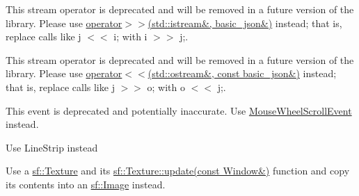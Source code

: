 
\begin{DoxyRefList}
\item[\label{deprecated__deprecated000002}%
\Hypertarget{deprecated__deprecated000002}%
Member \hyperlink{classnlohmann_1_1basic__json_ab7285a92514fcdbe6de505ebaba92ea3}{nlohmann\+:\+:basic\+\_\+json$<$ Object\+Type, Array\+Type, String\+Type, Boolean\+Type, Number\+Integer\+Type, Number\+Unsigned\+Type, Number\+Float\+Type, Allocator\+Type, J\+S\+O\+N\+Serializer $>$\+:\+:operator$<$$<$} (\hyperlink{classnlohmann_1_1basic__json}{basic\+\_\+json} \&j, std\+::istream \&i)]This stream operator is deprecated and will be removed in a future version of the library. Please use \hyperlink{classnlohmann_1_1basic__json_aaf363408931d76472ded14017e59c9e8}{operator$>$$>$(std\+::istream\&, basic\+\_\+json\&)} instead; that is, replace calls like {\ttfamily j $<$$<$ i;} with {\ttfamily i $>$$>$ j;}.  
\item[\label{deprecated__deprecated000001}%
\Hypertarget{deprecated__deprecated000001}%
Member \hyperlink{classnlohmann_1_1basic__json_a9e06deabe69262c3ffc5533d32856983}{nlohmann\+:\+:basic\+\_\+json$<$ Object\+Type, Array\+Type, String\+Type, Boolean\+Type, Number\+Integer\+Type, Number\+Unsigned\+Type, Number\+Float\+Type, Allocator\+Type, J\+S\+O\+N\+Serializer $>$\+:\+:operator$>$$>$} (const \hyperlink{classnlohmann_1_1basic__json}{basic\+\_\+json} \&j, std\+::ostream \&o)]This stream operator is deprecated and will be removed in a future version of the library. Please use \hyperlink{classnlohmann_1_1basic__json_a5e34c5435e557d0bf666bd7311211405}{operator$<$$<$(std\+::ostream\&, const basic\+\_\+json\&)} instead; that is, replace calls like {\ttfamily j $>$$>$ o;} with {\ttfamily o $<$$<$ j;}.  
\item[\label{deprecated__deprecated000019}%
\Hypertarget{deprecated__deprecated000019}%
Class \hyperlink{structsf_1_1_event_1_1_mouse_wheel_event}{sf\+:\+:Event\+:\+:Mouse\+Wheel\+Event} ]This event is deprecated and potentially inaccurate. Use \hyperlink{structsf_1_1_event_1_1_mouse_wheel_scroll_event}{Mouse\+Wheel\+Scroll\+Event} instead. 
\item[\label{deprecated__deprecated000003}%
\Hypertarget{deprecated__deprecated000003}%
Member \hyperlink{group__graphics_gga5ee56ac1339984909610713096283b1ba5b09910f5d0f39641342184ccd0d1de3}{sf\+:\+:Lines\+Strip} ]Use Line\+Strip instead  
\item[\label{deprecated__deprecated000006}%
\Hypertarget{deprecated__deprecated000006}%
Member \hyperlink{classsf_1_1_render_window_a370137abe81f6b7d62b600ceeccd54d3}{sf\+:\+:Render\+Window\+:\+:capture} () const]Use a \hyperlink{classsf_1_1_texture}{sf\+::\+Texture} and its \hyperlink{classsf_1_1_texture_ad3cceef238f7d5d2108a98dd38c17fc5}{sf\+::\+Texture\+::update(const Window\&)} function and copy its contents into an \hyperlink{classsf_1_1_image}{sf\+::\+Image} instead.  

\end{DoxyRefList}
